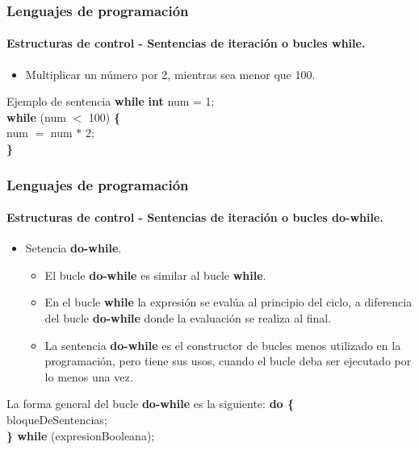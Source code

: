 \documentclass{beamer}
\begin{document}
		\begin{frame}
			\frametitle{Lenguajes de programaci\'on}
			\framesubtitle{Estructuras de control - Sentencias de iteraci\'on o bucles \textbf{while}.}

			\begin{itemize}
				\item Multiplicar un n\'umero por 2, mientras sea menor que 100. 
			\end{itemize}

			\begin{block}{Ejemplo de sentencia \textbf{while}}
				{\scriptsize
				\textbf{int} num = 1;\\
				\vspace{0.3cm}
				\textbf{while} (num $<$ 100) \textbf{\{} \\
				\hspace{0.3cm} num $=$ num $*$ 2; \\
				\textbf{\}}
			}
			\end{block}
		\end{frame}

		\begin{frame}
			\frametitle{Lenguajes de programaci\'on}
			\framesubtitle{Estructuras de control - Sentencias de iteraci\'on o bucles \textbf{do-while}.}

			\begin{itemize}
				\item Setencia \textbf{do-while}.
				\begin{itemize}
					\item El bucle \textbf{do-while} es similar al bucle \textbf{while}.
					\item En el bucle \textbf{while} la expresi\'on se eval\'ua al principio del ciclo, a diferencia del bucle \textbf{do-while} donde la evaluaci\'on se realiza al final.
					\item La sentencia \textbf{do-while} es el constructor de bucles menos utilizado en la programaci\'on, pero tiene sus usos, cuando el bucle deba ser ejecutado por lo menos una vez.
				\end{itemize}
			\end{itemize}

			\begin{block}{La forma general del bucle \textbf{do-while} es la siguiente:}
				{\scriptsize
				\textbf{do \{} \\
				\hspace{0.3cm} bloqueDeSentencias; \\
				\textbf{\} while} (expresionBooleana); \\
				}
			\end{block}
		\end{frame}
\end{document}
